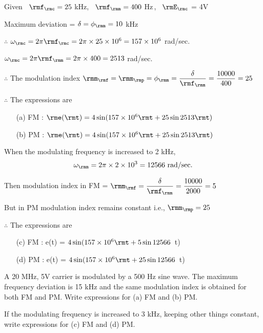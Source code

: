 \begin{solution}
Given~ $\rmf_\rmc = 25$ kHz, ~$\rmf_\rmm = 400$ Hz\,,~ $\rmE_\rmc$ =
4V

\smallskip
Maximum deviation = $\delta = \phi_\rmm = 10$ kHz

\smallskip
$\therefore$ $\omega_\rmc = 2 \pi \rmf_\rmc = 2 \pi \times 25 \times 10^6 =
157\times 10^6$ rad/sec.

\smallskip
\quad$\omega_\rmc = 2 \pi \rmf_\rmm =  2 \pi \times 400 = 2513$ rad/sec.

\smallskip
$\therefore $ The modulation index $\rmm_\rmf = \rmm_\rmp = \phi_\rmm
= \dfrac{\delta}{\rmf_\rmm} = \dfrac{10000}{400} = 25$

\smallskip
$\therefore$ The expressions are
\begin{itemize}
\item[(a)] FM : $\rme(\rmt) = 4 \sin (157 \times 10^6 \rmt + 25 \sin
2513 \rmt)$

\item[(b)] PM : $\rme(\rmt) = 4 \sin (157 \times 10^6 \rmt + 25 \sin 2513 \rmt)$
\end{itemize}

When the modulating frequency is increased to 2 kHz,
$$
\omega_\rmm = 2 \pi \times 2 \times 10^3 = 12566 \text{ rad/sec.}
$$

\smallskip
Then modulation index in FM = $\rmm_\rmf = \dfrac{\delta}{\rmf_\rmm}= \dfrac{10000}{2000} = 5$

\smallskip
But in PM modulation index remains constant i.e., $\rmm_\rmp = 25$

\smallskip
$\therefore$ The expressions are
\begin{itemize}
\item[(c)] FM : e(t) = $4 \sin (157 \times 10^6 \rmt + 5 \sin 12566$~t)

\item[(d)] PM : e(t) = $4 \sin (157 \times 10^6 \rmt + 25 \sin 12566$~t)
\end{itemize}
\end{solution}

\vfill\eject

\begin{problem}\label{prob8.26}
A 20 MHz, 5V carrier is modulated by a 500 Hz sine wave. The maximum
frequency deviation is 15 kHz and the same modulation index is
obtained for both FM and PM. Write expressions for (a) FM and (b) PM.

\smallskip
If the modulating frequency is increased to 3 kHz, keeping other
things constant, write expressions for (c) FM and (d) PM.
\end{problem}

